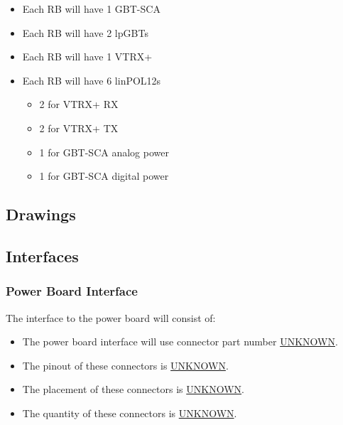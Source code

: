 \documentclass[11pt]{article}
\begin{document}
\begin{itemize}
\item Each RB will have 1 GBT-SCA
\item Each RB will have 2 lpGBTs
\item Each RB will have 1 VTRX+
\item Each RB will have 6 linPOL12s
\begin{itemize}
\item 2 for VTRX+ RX
\item 2 for VTRX+ TX
\item 1 for GBT-SCA analog power
\item 1 for GBT-SCA digital power
\end{itemize}
\end{itemize}
\subsection{Drawings}
\label{sec:org830dfa2}
\subsection{Interfaces}
\label{sec:org774e028}
\subsubsection{Power Board Interface}
\label{sec:orgd5a2ca8}
The interface to the power board will consist of:
\begin{itemize}
\item The power board interface will use connector part number \uline{UNKNOWN}.
\item The pinout of these connectors is \uline{UNKNOWN}.
\item The placement of these connectors is \uline{UNKNOWN}.
\item The quantity of these connectors is \uline{UNKNOWN}.
\end{itemize}
\end{document}
